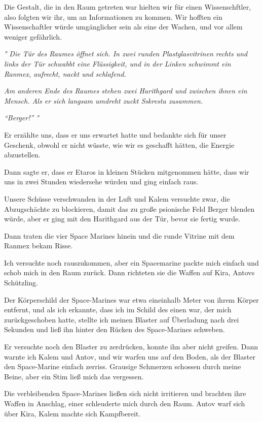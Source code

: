 \documentclass[11pt]{article}
\begin{document}
Die Gestalt, die in den Raum getreten war hielten wir für einen
Wissenschftler, also folgten wir ihr, um an Informationen zu kommen. Wir
hofften ein Wissenschaftler würde umgänglicher sein als eine der Wachen,
und vor allem weniger gefährlich.

\emph{° Die Tür des Raumes öffnet sich. In zwei runden Plastglasvitrinen
rechts und links der Tür schwabbt eine Flüssigkeit, und in der Linken
schwimmt ein Ranmex, aufrecht, nackt und schlafend.}

\emph{Am anderen Ende des Raumes stehen zwei Harithgard und zwischen
ihnen ein Mensch. Als er sich langsam umdreht zuckt Sskresta zusammen.}

\emph{``Berger!'' °}

Er erzählte uns, dass er uns erwartet hatte und bedankte sich für unser
Geschenk, obwohl er nicht wüsste, wie wir es geschafft hätten, die
Energie abzustellen.

Dann sagte er, dass er Etaros in kleinen Stücken mitgenommen hätte, dass
wir uns in zwei Stunden wiedersehe würden und ging einfach raus.

Unsere Schüsse verschwanden in der Luft und Kalem versuchte zwar, die
Abzugschächte zu blockieren, damit das zu große psionische Feld Berger
blenden würde, aber er ging mit den Harithgard aus der Tür, bevor sie
fertig wurde.

Dann traten die vier Space Marines hinein und die runde Vitrine mit dem
Ranmex bekam Risse.

Ich versuchte noch rauszukommen, aber ein Spacemarine packte mich
einfach und schob mich in den Raum zurück. Dann richteten sie die Waffen
auf Kira, Antovs Schützling.

Der Körperschild der Space-Marines war etwa eineinhalb Meter von ihrem
Körper entfernt, und als ich erkannte, dass ich im Schild des einen war,
der mich zurückgeschoben hatte, stellte ich meinen Blaster auf
Überladung nach drei Sekunden und ließ ihn hinter den Rücken des
Space-Marines schweben.

Er versuchte noch den Blaster zu zerdrücken, konnte ihn aber nicht
greifen. Dann warnte ich Kalem und Antov, und wir warfen uns auf den
Boden, als der Blaster den Space-Marine einfach zerriss. Grausige
Schmerzen schossen durch meine Beine, aber ein Stim ließ mich das
vergessen.

Die verbleibenden Space-Marines ließen sich nicht irritieren und
brachten ihre Waffen in Anschlag, einer schleuderte mich durch den Raum.
Antov warf sich über Kira, Kalem machte sich Kampfbereit.
\end{document}
